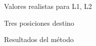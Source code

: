 \begin{frame}{Valores realistas para L1, L2}
    
\end{frame}


\begin{frame}{Tres posiciones destino}
    
\end{frame}


\begin{frame}{Resultados del método}
    
\end{frame}